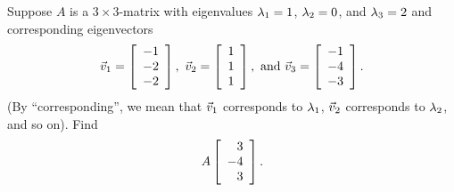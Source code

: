 \documentclass{ximera}
\author{Zack Reed}
\begin{document}
\begin{problem}
  Suppose $A$ is a $3\times 3$-matrix with eigenvalues
  $\eigenvar_1=1$, $\eigenvar_2=0$, and $\eigenvar_3=2$ and
  corresponding eigenvectors
  \begin{equation*}
    \vect{v}_1 = \startmat{r}
      -1 \\
      -2 \\
      -2
    \stopmat,
    \quad
    \vect{v}_2 = \startmat{r}
      1 \\
      1 \\
      1
    \stopmat,
    \quad\mbox{and}\quad
    \vect{v}_3 = \startmat{r}
      -1 \\
      -4 \\
      -3
    \stopmat.
  \end{equation*}
  (By ``corresponding'', we mean that $\vect{v}_1$ corresponds to
  $\eigenvar_1$, $\vect{v}_2$ corresponds to $\eigenvar_2$, and so
  on).  Find
  \begin{equation*}
    A\startmat{r}
      3 \\
      -4 \\
      3
    \stopmat.
  \end{equation*}
\end{problem}
\end{document}
